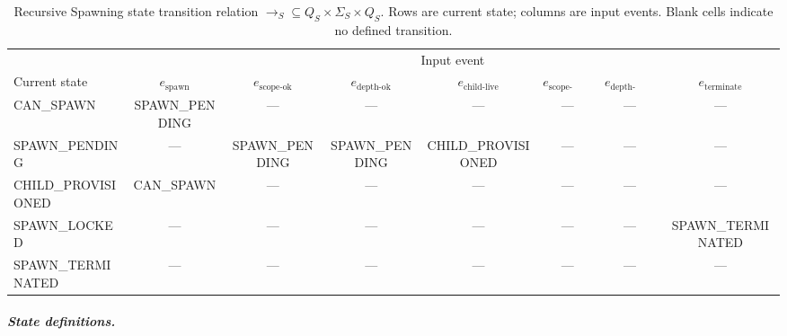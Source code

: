\begin{table}[htbp]
\caption{Recursive Spawning state transition relation $\rightarrow_S \subseteq Q_S \times \Sigma_S \times Q_S$. Rows are current state; columns are input events. Blank cells indicate no defined transition.}
\label{tab:spawn-transition}
\begin{tabular}{@{}lccccccc@{}}
\toprule
 & \multicolumn{7}{c}{Input event} \\
\cmidrule(l){2-8}
Current state & $e_{\text{spawn}}$ & $e_{\text{scope-ok}}$ & $e_{\text{depth-ok}}$ & $e_{\text{child-live}}$ & $e_{\text{scope-violation}}$ & $e_{\text{depth-violation}}$ & $e_{\text{terminate}}$ \\
\midrule
CAN\_SPAWN & SPAWN\_PENDING & — & — & — & — & — & — \\
SPAWN\_PENDING & — & SPAWN\_PENDING & SPAWN\_PENDING & CHILD\_PROVISIONED & — & — & — \\
CHILD\_PROVISIONED & CAN\_SPAWN & — & — & — & — & — & — \\
SPAWN\_LOCKED & — & — & — & — & — & — & SPAWN\_TERMINATED \\
SPAWN\_TERMINATED & — & — & — & — & — & — & — \\
\bottomrule
\end{tabular}
\end{table}

\subparagraph{State definitions.}

